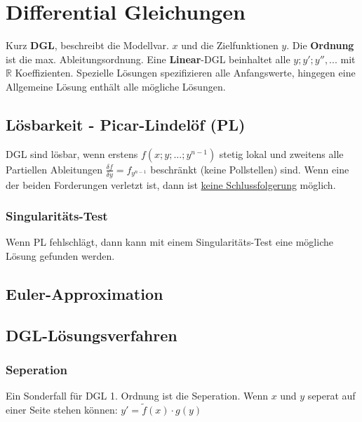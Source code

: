 \section{Differential Gleichungen}
Kurz \textbf{DGL}, beschreibt die Modellvar. $x$ und die Zielfunktionen $y$. Die \textbf{Ordnung} ist die max. Ableitungsordnung. Eine \textbf{Linear}-DGL beinhaltet alle $y;y';y'',...$ mit $\mathbb{R}$ Koeffizienten. Spezielle Lösungen spezifizieren alle Anfangswerte, hingegen eine Allgemeine Lösung enthält alle mögliche Lösungen.

\subsection{Lösbarkeit - Picar-Lindelöf (PL)}
DGL sind lösbar, wenn erstens $f(x;y;...;y^{n-1})$ stetig lokal und zweitens alle Partiellen Ableitungen $\frac{\delta f}{\delta y} = f_{y^{n-1}}$ beschränkt (keine Pollstellen) sind. Wenn eine der beiden Forderungen verletzt ist, dann ist \underline{keine Schlussfolgerung} möglich.

\subsubsection{Singularitäts-Test}
Wenn PL fehlschlägt, dann kann mit einem Singularitäts-Test eine mögliche Lösung gefunden werden.

\subsection{Euler-Approximation}

\subsection{DGL-Lösungsverfahren}
\subsubsection{Seperation}
Ein Sonderfall für DGL 1. Ordnung ist die Seperation. Wenn $x$ und $y$ seperat auf einer Seite stehen können: $y' = \tilde{f}(x) \cdot g(y)$

